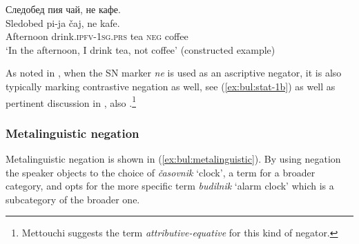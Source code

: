 \documentclass[output=paper,colorlinks=true, citecolor=brown]{langscibook}
\begin{document}
\ea Следобед пия чай, не кафе.\\ \label{ex:bul:contrastive-1} 
  	\gll Sledobed pi-ja čaj, ne kafe.\\
  	Afternoon drink.\textsc{ipfv}-\textsc{1sg.prs} tea \textsc{neg} coffee\\
\glt `In the afternoon, I drink tea, not coffee' (constructed example) 
\z

As noted in , when the SN marker \textit{ne} is used as an ascriptive negator, it is also typically marking contrastive negation as well, see (\ref{ex:bul:stat-1b}) as well as pertinent discussion in \citet{Mettouchi2006}, also \citet{Mettouchi2021}.\footnote{Mettouchi \citeyear{Mettouchi2021} suggests the term \textit{attributive-equative} for this kind of negator.}

\subsubsection{Metalinguistic negation} \label{sec:bul:metalinguistic_neg}
Metalinguistic negation is shown in (\ref{ex:bul:metalinguistic}). By using negation the speaker objects to the choice of \textit{časovnik} `clock', a term for a broader category, and opts for the more specific term \textit{budilnik} `alarm clock' which is a subcategory of the broader one. 

\end{document}
